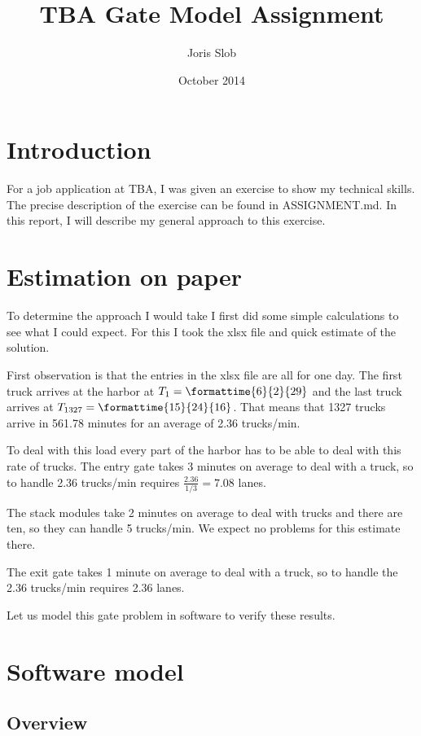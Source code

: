 \documentclass{article}
\begin{document}
\title{TBA Gate Model Assignment}
\author{Joris Slob}
\date{October 2014}
\maketitle

\section{Introduction}

For a job application at TBA, I was given an exercise to show my
technical skills. The precise description of the exercise can be found
in ASSIGNMENT.md. In this report, I will describe my general approach
to this exercise.

\section{Estimation on paper}

To determine the approach I would take I first did some simple
calculations to see what I could expect. For this I took the xlsx file
and quick estimate of the solution.

First observation is that the entries in the xlsx file are all for one
day. The first truck arrives at the harbor at $T_1 =
\mbox{\formattime{6}{2}{29}}$ and the last truck arrives at $T_{1327}
= \mbox{\formattime{15}{24}{16}}$. That means that 1327 trucks arrive
in 561.78 minutes for an average of 2.36 trucks/min.

To deal with this load every part of the harbor has to be able to deal
with this rate of trucks. The entry gate takes 3 minutes on average to
deal with a truck, so to handle 2.36 trucks/min requires
$\frac{2.36}{1/3} = 7.08$ lanes.

The stack modules take 2 minutes on average to deal with trucks and
there are ten, so they can handle 5 trucks/min. We expect no problems
for this estimate there.

The exit gate takes 1 minute on average to deal with a truck, so to
handle the 2.36 trucks/min requires 2.36 lanes.

Let us model this gate problem in software to verify these results.

\section{Software model}

\subsection{Overview}
\end{document}
